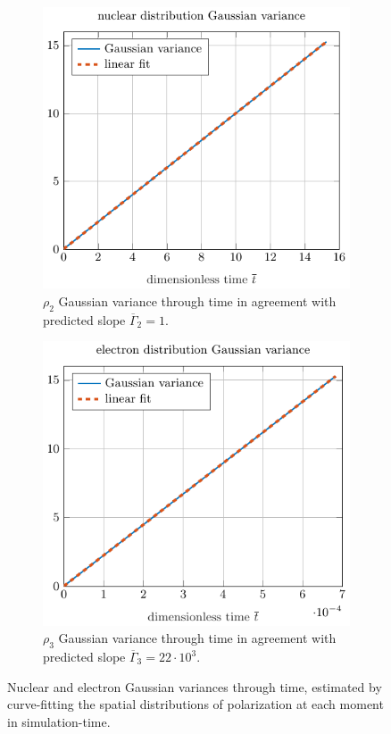 \documentclass[onecolumn]{amsart}
\begin{document}
\begin{figure}
\begin{subfigure}[b]{.5\linewidth}
\centering
\includegraphics[width=.95\linewidth]{figures/gaussian_variance_vs_time_2_standalone.pdf}
\caption{\small $\rho_2$ Gaussian variance through time in \newline agreement with predicted slope $\overline{\Gamma}_2 = 1$.}\label{fig:2a}
\end{subfigure}%
\begin{subfigure}[b]{.5\linewidth}
\centering
\includegraphics[width=.95\linewidth]{figures/gaussian_variance_vs_time_3_standalone.pdf}
\caption{\small $\rho_3$ Gaussian variance through time in \newline agreement with predicted slope $\overline{\Gamma}_3 = 22 \cdot 10^{3}$.}\label{fig:2b}
\end{subfigure}
\caption{Nuclear and electron Gaussian variances through time, estimated by curve-fitting the spatial distributions of polarization at each moment in simulation-time.}\label{fig:2}
\end{figure}
\end{document}
